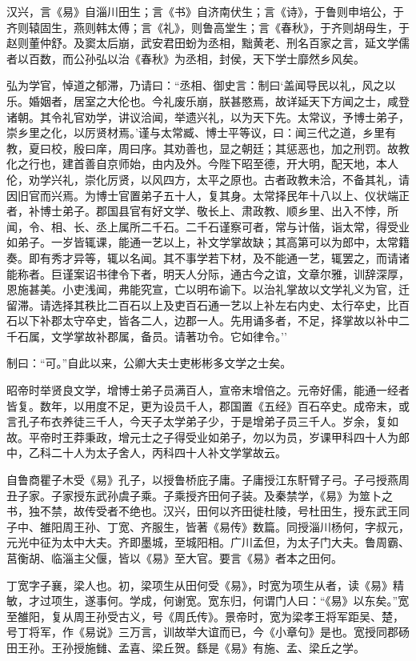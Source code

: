 \documentclass[]{article}
\begin{document}
汉兴，言《易》自淄川田生；言《书》自济南伏生；言《诗》，于鲁则申培公，于齐则辕固生，燕则韩太傅；言《礼》，则鲁高堂生；言《春秋》，于齐则胡母生，于赵则董仲舒。及窦太后崩，武安君田蚡为丞相，黜黄老、刑名百家之言，延文学儒者以百数，而公孙弘以治《春秋》为丞相，封侯，天下学士靡然乡风矣。

弘为学官，悼道之郁滞，乃请曰：``丞相、御史言：制曰`盖闻导民以礼，风之以乐。婚姻者，居室之大伦也。今礼废乐崩，朕甚愍焉，故详延天下方闻之士，咸登诸朝。其令礼官劝学，讲议洽闻，举遗兴礼，以为天下先。太常议，予博士弟子，崇乡里之化，以厉贤材焉。'谨与太常臧、博士平等议，曰：闻三代之道，乡里有教，夏曰校，殷曰庠，周曰序。其劝善也，显之朝廷；其惩恶也，加之刑罚。故教化之行也，建首善自京师始，由内及外。今陛下昭至德，开大明，配天地，本人伦，劝学兴礼，崇化厉贤，以风四方，太平之原也。古者政教未洽，不备其礼，请因旧官而兴焉。为博士官置弟子五十人，复其身。太常择民年十八以上、仪状端正者，补博士弟子。郡国县官有好文学、敬长上、肃政教、顺乡里、出入不悖，所闻，令、相、长、丞上属所二千石。二千石谨察可者，常与计偕，诣太常，得受业如弟子。一岁皆辄课，能通一艺以上，补文学掌故缺；其高第可以为郎中，太常籍奏。即有秀才异等，辄以名闻。其不事学若下材，及不能通一艺，辄罢之，而请诸能称者。巨谨案诏书律令下者，明天人分际，通古今之谊，文章尔雅，训辞深厚，恩施甚美。小吏浅闻，弗能究宣，亡以明布谕下。以治礼掌故以文学礼义为官，迁留滞。请选择其秩比二百石以上及吏百石通一艺以上补左右内史、太行卒史，比百石以下补郡太守卒史，皆各二人，边郡一人。先用诵多者，不足，择掌故以补中二千石属，文学掌故补郡属，备员。请著功令。它如律令。''

制曰：``可。''自此以来，公卿大夫士吏彬彬多文学之士矣。

昭帝时举贤良文学，增博士弟子员满百人，宣帝末增倍之。元帝好儒，能通一经者皆复。数年，以用度不足，更为设员千人，郡国置《五经》百石卒史。成帝末，或言孔子布衣养徒三千人，今天子太学弟子少，于是增弟子员三千人。岁余，复如故。平帝时王莽秉政，增元士之子得受业如弟子，勿以为员，岁课甲科四十人为郎中，乙科二十人为太子舍人，丙科四十人补文学掌故云。

自鲁商瞿子木受《易》孔子，以授鲁桥庇子庸。子庸授江东馯臂子弓。子弓授燕周丑子家。子家授东武孙虞子乘。子乘授齐田何子装。及秦禁学，《易》为筮卜之书，独不禁，故传受者不绝也。汉兴，田何以齐田徙杜陵，号杜田生，授东武王同子中、雒阳周王孙、丁宽、齐服生，皆著《易传》数篇。同授淄川杨何，字叔元，元光中征为太中大夫。齐即墨城，至城阳相。广川孟但，为太子门大夫。鲁周霸、莒衡胡、临淄主父偃，皆以《易》至大官。要言《易》者本之田何。

丁宽字子襄，梁人也。初，梁项生从田何受《易》，时宽为项生从者，读《易》精敏，才过项生，遂事何。学成，何谢宽。宽东归，何谓门人曰：``《易》以东矣。''宽至雒阳，复从周王孙受古义，号《周氏传》。景帝时，宽为梁孝王将军距吴、楚，号丁将军，作《易说》三万言，训故举大谊而已，今《小章句》是也。宽授同郡砀田王孙。王孙授施雠、孟喜、梁丘贺。繇是《易》有施、孟、梁丘之学。
\end{document}
